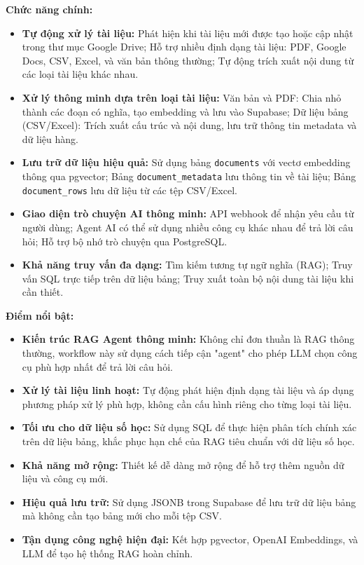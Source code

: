 \textbf{Chức năng chính:}
\begin{itemize}
    \item \textbf{Tự động xử lý tài liệu:} Phát hiện khi tài liệu mới được tạo hoặc cập nhật trong thư mục Google Drive; Hỗ trợ nhiều định dạng tài liệu: PDF, Google Docs, CSV, Excel, và văn bản thông thường; Tự động trích xuất nội dung từ các loại tài liệu khác nhau.
    
    \item \textbf{Xử lý thông minh dựa trên loại tài liệu:} Văn bản và PDF: Chia nhỏ thành các đoạn có nghĩa, tạo embedding và lưu vào Supabase; Dữ liệu bảng (CSV/Excel): Trích xuất cấu trúc và nội dung, lưu trữ thông tin metadata và dữ liệu hàng.
    
    \item \textbf{Lưu trữ dữ liệu hiệu quả:} Sử dụng bảng \texttt{documents} với vectơ embedding thông qua pgvector; Bảng \texttt{document\_metadata} lưu thông tin về tài liệu; Bảng \texttt{document\_rows} lưu dữ liệu từ các tệp CSV/Excel.
    
    \item \textbf{Giao diện trò chuyện AI thông minh:} API webhook để nhận yêu cầu từ người dùng; Agent AI có thể sử dụng nhiều công cụ khác nhau để trả lời câu hỏi; Hỗ trợ bộ nhớ trò chuyện qua PostgreSQL.
    
    \item \textbf{Khả năng truy vấn đa dạng:} Tìm kiếm tương tự ngữ nghĩa (RAG); Truy vấn SQL trực tiếp trên dữ liệu bảng; Truy xuất toàn bộ nội dung tài liệu khi cần thiết.
\end{itemize}

\textbf{Điểm nổi bật:}
\begin{itemize}
    \item \textbf{Kiến trúc RAG Agent thông minh:} Không chỉ đơn thuần là RAG thông thường, workflow này sử dụng cách tiếp cận "agent" cho phép LLM chọn công cụ phù hợp nhất để trả lời câu hỏi.
    
    \item \textbf{Xử lý tài liệu linh hoạt:} Tự động phát hiện định dạng tài liệu và áp dụng phương pháp xử lý phù hợp, không cần cấu hình riêng cho từng loại tài liệu.
    
    \item \textbf{Tối ưu cho dữ liệu số học:} Sử dụng SQL để thực hiện phân tích chính xác trên dữ liệu bảng, khắc phục hạn chế của RAG tiêu chuẩn với dữ liệu số học.
    
    \item \textbf{Khả năng mở rộng:} Thiết kế dễ dàng mở rộng để hỗ trợ thêm nguồn dữ liệu và công cụ mới.
    
    \item \textbf{Hiệu quả lưu trữ:} Sử dụng JSONB trong Supabase để lưu trữ dữ liệu bảng mà không cần tạo bảng mới cho mỗi tệp CSV.
    
    \item \textbf{Tận dụng công nghệ hiện đại:} Kết hợp pgvector, OpenAI Embeddings, và LLM để tạo hệ thống RAG hoàn chỉnh.
\end{itemize}

